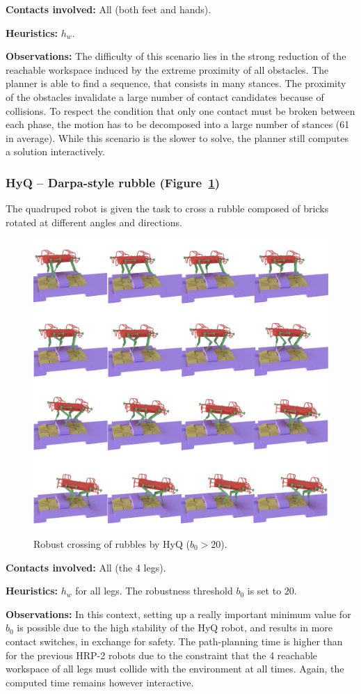 \noindent\textbf{Contacts involved:} All (both feet and hands).

\noindent\textbf{Heuristics:} $h_w$.

\noindent\textbf{Observations:} The difficulty of this scenario lies in the strong reduction of the reachable workspace induced 
by the extreme proximity of all obstacles. The planner is able to find a sequence, that consists in many stances.
The proximity of the obstacles invalidate a large number of contact candidates because of collisions. To respect the condition
that only one contact must be broken between each phase, the motion has to be decomposed into a large number of stances (61 in average).
While this scenario is the slower to solve, the planner still computes a solution interactively.


\subsubsection{HyQ -- Darpa-style rubble (Figure~\ref{fig:darpa})}
The quadruped robot is given the task to cross a rubble composed of bricks rotated at different angles and directions.

\begin{figure}
  \centering
  \includegraphics[width=0.5\linewidth]{figures/darpa}
  \caption{
           Robust crossing of rubbles by HyQ ($b_0 > 20$). }
		   \label{fig:darpa}
\end{figure}


\noindent\textbf{Contacts involved:} All (the 4 legs).

\noindent\textbf{Heuristics:} $h_w$ for all legs. The robustness threshold $b_0$ is set to $20$.

\noindent\textbf{Observations:} In this context, setting up a really important minimum value for $b_0$ is possible due to the high
stability of the HyQ robot, and results in more contact switches, in exchange for safety. The path-planning time is higher than for the previous HRP-2 robots due to the constraint that the 4 reachable workspace of all legs must
collide with the environment at all times. %
Again, the computed time remains however \gls{interactive}.

